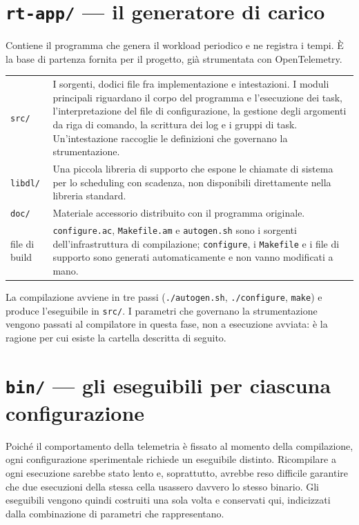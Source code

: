 \vspace{-.4em}
\section{\texttt{rt-app/} --- il generatore di carico}

Contiene il programma che genera il workload periodico e ne registra i tempi. \`E la base di
partenza fornita per il progetto, gi\`a strumentata con OpenTelemetry.

\begin{center}\small
\begin{tabular}{p{3.4cm}p{10.9cm}}
\toprule
\texttt{src/} & I sorgenti, dodici file fra implementazione e intestazioni. I moduli principali
riguardano il corpo del programma e l'esecuzione dei task, l'interpretazione del file di
configurazione, la gestione degli argomenti da riga di comando, la scrittura dei log e i gruppi di
task. Un'intestazione raccoglie le definizioni che governano la strumentazione. \\
\addlinespace
\texttt{libdl/} & Una piccola libreria di supporto che espone le chiamate di sistema per lo
scheduling con scadenza, non disponibili direttamente nella libreria standard. \\
\addlinespace
\texttt{doc/} & Materiale accessorio distribuito con il programma originale. \\
\addlinespace
file di build & \texttt{configure.ac}, \texttt{Makefile.am} e \texttt{autogen.sh} sono i sorgenti
dell'infrastruttura di compilazione; \texttt{configure}, i \texttt{Makefile} e i file di supporto
sono generati automaticamente e non vanno modificati a mano. \\
\bottomrule
\end{tabular}
\end{center}

La compilazione avviene in tre passi (\texttt{./autogen.sh}, \texttt{./configure},
\texttt{make}) e produce l'eseguibile in \texttt{src/}. I parametri che governano la strumentazione
vengono passati al compilatore in questa fase, non a esecuzione avviata: \`e la ragione per cui
esiste la cartella descritta di seguito.

\section{\texttt{bin/} --- gli eseguibili per ciascuna configurazione}

Poich\'e il comportamento della telemetria \`e fissato al momento della compilazione, ogni
configurazione sperimentale richiede un eseguibile distinto. Ricompilare a ogni esecuzione
sarebbe stato lento e, soprattutto, avrebbe reso difficile garantire che due esecuzioni della stessa
cella usassero davvero lo stesso binario. Gli eseguibili vengono quindi costruiti una sola volta e
conservati qui, indicizzati dalla combinazione di parametri che rappresentano.

